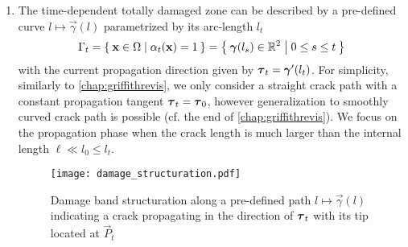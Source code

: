 \begin{hypothesis} \label{hypo:damageband} \noindent
\begin{enumerate}
\item The time-dependent totally damaged zone can be described by a pre-defined curve $l\mapsto\vec{\gamma}(l)$ parametrized by its arc-length $l_t$
\begin{equation} \label{eq:graddamalt}
\Gamma_t=\set{\vec{x}\in\Omega|\alpha_t(\vec{x})=1}=\set{\vec{\gamma}(l_s)\in\mathbb{R}^2|0\leq s\leq t}
\end{equation}
with the current propagation direction given by $\vtau_t=\vec{\gamma}'(l_t)$. For simplicity, similarly to \cref{chap:griffithrevis}, we only consider a straight crack path with a constant propagation tangent $\vtau_t=\vtau_0$, however generalization to smoothly curved crack path is possible (cf. the end of \cref{chap:griffithrevis}). We focus on the propagation phase when the crack length is much larger than the internal length $\ell\ll l_0\leq l_t$.
\begin{figure}[htbp]
\centering
\texttt{[image: damage\_structuration.pdf]}
\caption{Damage band structuration along a pre-defined path $l\mapsto\vec{\gamma}(l)$ indicating a crack propagating in the direction of $\vtau_t$ with its tip located at $\vec{P}_t$} \label{fig:damage_structuration}
\end{figure}


\end{enumerate}
\end{hypothesis}
